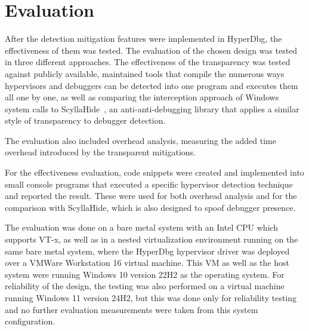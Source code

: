 \section{Evaluation}\label{s:evaluation}

After the detection mitigation features were implemented in HyperDbg, the effectiveness of them was tested. The evaluation of the chosen design was tested in three 
different approaches. The effectiveness of the transparency was tested against publicly available, maintained tools that compile the numerous ways hypervisors 
and debuggers can be detected into one program and executes them all one by one, as well as comparing the interception approach of Windows system calls to 
ScyllaHide~\cite{scyllahide}, an anti-anti-debugging library that applies 
a similar style of transparency to debugger detection.

The evaluation also included overhead analysis, measuring the added time overhead introduced by the transparent mitigations.

For the effectiveness evaluation, code snippets were created and implemented into small console programs that executed a specific hypervisor detection technique 
and reported the result. These were used for both overhead analysis and for the comparison with ScyllaHide, which is also designed to spoof debugger presence.

The evaluation was done on a bare metal system with an Intel CPU which supports VT-x, as well as in a nested virtualization environment running on the same bare metal system, 
where the HyperDbg hypervisor driver was deployed over a VMWare Workstation 16 virtual machine. This VM as well as the host system were running Windows 10 version 22H2 as the operating system. 
For reliability of the design, the testing was also performed on a virtual machine running Windows 11 version 24H2, 
but this was done only for reliability testing and no further evaluation measurements were taken from this system configuration. 


